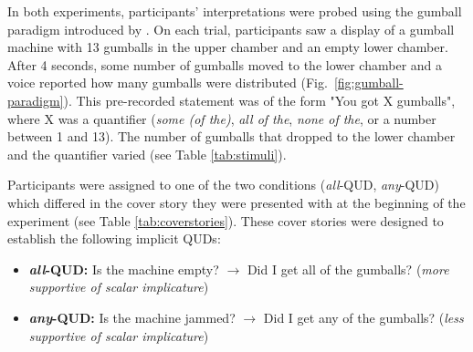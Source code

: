 \documentclass[10pt,letterpaper]{article}
\begin{document}
In both experiments, participants' interpretations were probed using the gumball paradigm introduced by .  On each trial, participants saw a display of a gumball machine with 13 gumballs in the upper chamber and an empty lower chamber. After 4 seconds, some number of gumballs moved to the lower chamber and a voice reported how many gumballs were distributed (Fig.~\ref{fig:gumball-paradigm}). This pre-recorded statement was of the form "You got X gumballs", where X was a quantifier (\textit{some (of the)},  \textit{all of the}, \textit{none of the}, or a number between 1 and 13). The number of gumballs that dropped to the lower chamber and the quantifier  varied (see Table \ref{tab:stimuli}).

Participants were assigned to one of the two conditions (\textit{all}-QUD, \textit{any}-QUD) which differed in the cover story they were presented with at the beginning of the experiment (see Table \ref{tab:coverstories}). These cover stories were designed to establish the following implicit QUDs:
\begin{itemize}
\item \textbf{\textit{all}-QUD:} Is the machine empty? $\rightarrow$ Did I get all of the gumballs? (\textit{more supportive of scalar implicature})
\item \textbf{\textit{any}-QUD:} Is the machine jammed? $\rightarrow$ Did I get any of the gumballs? (\textit{less supportive of scalar implicature})
\end{itemize}


\end{document}
